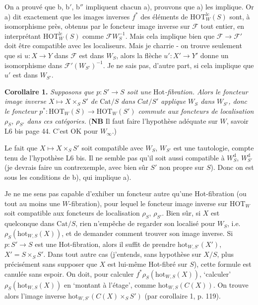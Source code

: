 \documentclass[11pt]{article}
\newcommand{\msp}[1]{\marginpar{\footnotesize [#1]}}
\newcommand{\HOT}{\mathrm{HOT}}
\newcommand{\Cat}{\mathrm{Cat}}
\newcommand{\hot}{\mathrm{hot}}
\begin{document}
On a prouvé que b, b$'$, b$''$ impliquent chacun a), prouvons que a) les implique. Or a) dit exactement que les images inverses $f^*$ des éléments de $\HOT_W^{\mathrm{lc}}(S)$
\msp{page 126}
sont, à isomorphisme près, obtenus par le foncteur image inverse sur $\mathcal{F}$ tout entier, en interprétant $\HOT_W^{\mathrm{lc}}(S)$ comme $\mathcal{F}W_S^{-1}$. Mais cela implique bien que $\mathcal{F} \longrightarrow \mathcal{F}'$ doit être compatible avec les localiseurs. Mais je charrie - on trouve seulement que si $u : X \longrightarrow Y$ dans $\mathcal{F}$ est dans $W_S$, alors la flèche $u' : X' \longrightarrow Y'$ donne un isomorphisme dans $\mathcal{F}'(W_{S'})^{-1}$. Je ne sais pas, d'autre part, si cela implique que $u'$ est dans $W_{S'}$.

\textbf{Corollaire 1.} \textit{Supposons que $p : S' \longrightarrow S$ soit une} Hot\textit{-fibration. Alors le foncteur image inverse $X \longmapsto X \times_S S'$ de} $\Cat/S$ \textit{dans $\mathit{Cat}/S'$ applique $W_S$ dans $W_{S'}$, donc le foncteur $p^* : \HOT_W(S) \longrightarrow \HOT_W(S')$ commute aux foncteurs de localisation $\rho_S$, $\rho_{S'}$ dans ces catégories.} (\textbf{NB} Il faut faire l'hypothèse adéquate sur $W$, savoir L6 bis page 44. C'est OK pour $W_\infty$.)

Le fait que $X \longmapsto X \times_S S'$ soit compatible avec $W_S$, $W_{S'}$ est une tautologie, compte tenu de l'hypothèse L6 bis. Il ne semble pas qu'il soit aussi compatible à $W_S^{\mathrm{d}}$, $W_{S'}^{\mathrm{d}}$ (je devrais faire un contrexemple, avec bien sûr $S'$ non propre sur $S$). Donc on est sous les conditions de b), qui implique a).

\msp{page 127}

Je ne me sens pas capable d'exhiber un foncteur autre qu'une Hot-fibration (ou tout au moins une $W$-fibration), pour lequel le foncteur image inverse sur $\HOT_W$ soit compatible aux foncteurs de localisation $\rho_S$, $\rho_{S'}$. Bien sûr, si $X$ est quelconque dans $\Cat/S$, rien n'empêche de regarder son localisé pour $W_S$, i.e. $\rho_S(\hot_{W,S}(X))$, et de demander comment trouver son image inverse. Si $p : S' \longrightarrow S$ est une Hot-fibration, alors il suffit de prendre $\hot_{W,S'}(X')$, $X' = S \times_S S'$. Dans tout autre cas (j'entends, sans hypothèse sur $X/S$, plus %
précisément sans supposer que $X$ est lui-même Hot-fibré sur $S$), cette formule est canulée sans espoir. On doit, pour calculer $f^*\rho_S(\hot_{W,S}(X))$, `calculer' $\rho_S(\hot_{W,S}(X))$ en `montant à l'étage', comme $\hot_{W,S}(C(X))$. On trouve alors l'image inverse $\hot_{W,S'}(C(X) \times_S S')$ (par corollaire 1, p. 119).
\end{document}
